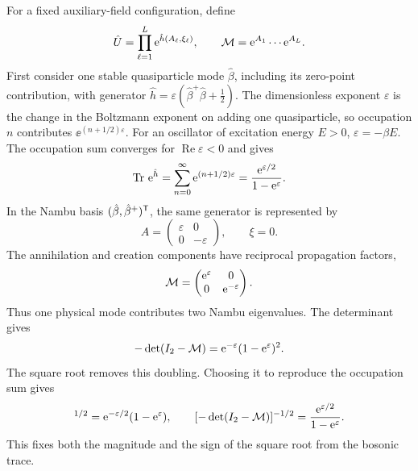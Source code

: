 For a fixed auxiliary-field configuration, define
\begin{equation}
    \hat U=\prod_{\ell=1}^{L}\mathrm{e}^{\hat h(A_\ell,\xi_\ell)},
    \qquad
    \mathcal{M}=\mathrm{e}^{A_1}\cdots\mathrm{e}^{A_L}.
\end{equation}
First consider one stable quasiparticle mode $\hat\beta$, including its zero-point contribution, with generator $\hat h=\varepsilon(\hat\beta^+\hat\beta+\frac12)$. The dimensionless exponent $\varepsilon$ is the change in the Boltzmann exponent on adding one quasiparticle, so occupation $n$ contributes $\ee^{(n+1/2)\varepsilon}$. For an oscillator of excitation energy $E>0$, $\varepsilon=-\beta E$. The occupation sum converges for $\operatorname{Re}\varepsilon<0$ and gives
\begin{equation}
    \operatorname{Tr}\,\mathrm{e}^{\hat h}
    =\sum_{n=0}^{\infty}\mathrm{e}^{(n+1/2)\varepsilon}
    =\frac{\mathrm{e}^{\varepsilon/2}}{1-\mathrm{e}^\varepsilon}.
\end{equation}
In the Nambu basis $(\hat\beta,\hat\beta^+)^{\mathsf{T}}$, the same generator is represented by
\begin{equation}
    A=\begin{pmatrix}\varepsilon&0\\0&-\varepsilon\end{pmatrix},
    \qquad \xi=0.
\end{equation}
The annihilation and creation components have reciprocal propagation factors,
\begin{equation}
    \mathcal{M}=\begin{pmatrix}\mathrm{e}^\varepsilon&0\\0&\mathrm{e}^{-\varepsilon}\end{pmatrix}.
\end{equation}
Thus one physical mode contributes two Nambu eigenvalues. The determinant gives
\begin{equation}
    -\det(I_2-\mathcal{M})
    =\mathrm{e}^{-\varepsilon}(1-\mathrm{e}^\varepsilon)^2.
\end{equation}
The square root removes this doubling. Choosing it to reproduce the occupation sum gives
\begin{equation}
    [-\det(I_2-\mc M)]^{1/2}
    =\ee^{-\varepsilon/2}(1-\ee^\varepsilon),
    \qquad
    [-\det(I_2-\mc M)]^{-1/2}
    =\frac{\ee^{\varepsilon/2}}{1-\ee^\varepsilon}.
\end{equation}
This fixes both the magnitude and the sign of the square root from the bosonic trace.

